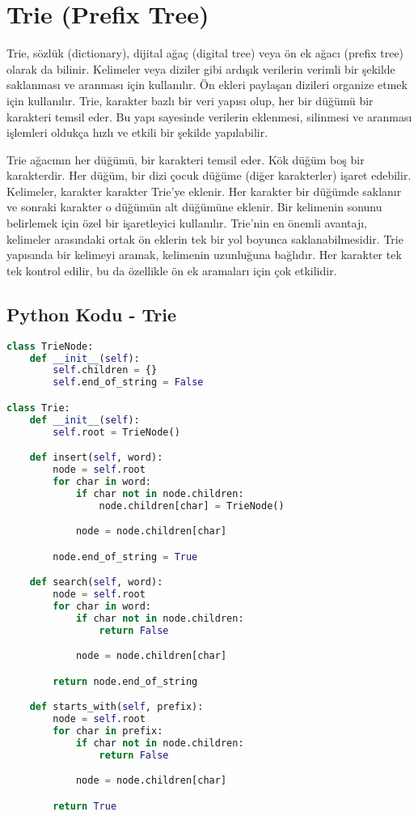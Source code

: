 \section{Trie (Prefix Tree)}

Trie, sözlük (dictionary), dijital ağaç (digital tree) veya ön ek ağacı (prefix tree) olarak da bilinir. Kelimeler veya diziler gibi ardışık verilerin verimli bir şekilde saklanması ve aranması için kullanılır. Ön ekleri paylaşan dizileri organize etmek için kullanılır. Trie, karakter bazlı bir veri yapısı olup, her bir düğümü bir karakteri temsil eder. Bu yapı sayesinde verilerin eklenmesi, silinmesi ve aranması işlemleri oldukça hızlı ve etkili bir şekilde yapılabilir.

Trie ağacının her düğümü, bir karakteri temsil eder. Kök düğüm boş bir karakterdir. Her düğüm, bir dizi çocuk düğüme (diğer karakterler) işaret edebilir. Kelimeler, karakter karakter Trie'ye eklenir. Her karakter bir düğümde saklanır ve sonraki karakter o düğümün alt düğümüne eklenir. Bir kelimenin sonunu belirlemek için özel bir işaretleyici kullanılır. Trie'nin en önemli avantajı, kelimeler arasındaki ortak ön eklerin tek bir yol boyunca saklanabilmesidir. Trie yapısında bir kelimeyi aramak, kelimenin uzunluğuna bağlıdır. Her karakter tek tek kontrol edilir, bu da özellikle ön ek aramaları için çok etkilidir.

\subsection{Python Kodu - Trie}

\begin{lstlisting}[language=Python]
class TrieNode:
    def __init__(self):
        self.children = {}
        self.end_of_string = False

class Trie:
    def __init__(self):
        self.root = TrieNode()

    def insert(self, word):
        node = self.root
        for char in word:
            if char not in node.children:
                node.children[char] = TrieNode()

            node = node.children[char]

        node.end_of_string = True

    def search(self, word):
        node = self.root
        for char in word:
            if char not in node.children:
                return False

            node = node.children[char]

        return node.end_of_string

    def starts_with(self, prefix):
        node = self.root
        for char in prefix:
            if char not in node.children:
                return False

            node = node.children[char]

        return True
\end{lstlisting}


\newpage